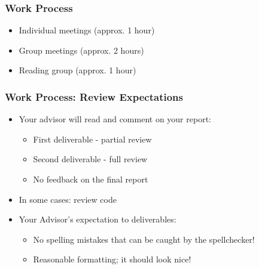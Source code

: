 \documentclass[hyperref={pdfpagelabels=false}, aspectratio=1610]{beamer}
\begin{document}
\begin{frame}
\frametitle{Work Process}
\begin{block}{}
 \begin{itemize}
  \item Individual meetings (approx. 1 hour)
  \item Group meetings (approx. 2 hours)
  \item Reading group (approx. 1 hour)
 \end{itemize}
\end{block}
\end{frame}


\begin{frame}
\frametitle{Work Process: Review Expectations}
\begin{block}{}
 \begin{itemize}
  \item Your advisor will read and comment on your report:
  \begin{itemize}
  	\item First deliverable - partial review
  	\item Second deliverable - full review
	\item No feedback on the final report
  \end{itemize}
  \item In some cases: review code 
  \item Your Advisor's expectation to deliverables:
  \begin{itemize}
  	\item No spelling mistakes that can be caught by the spellchecker!
	\item Reasonable formatting; it should look nice!
  \end{itemize}
 \end{itemize}
\end{block}
\end{frame}
\end{document}

